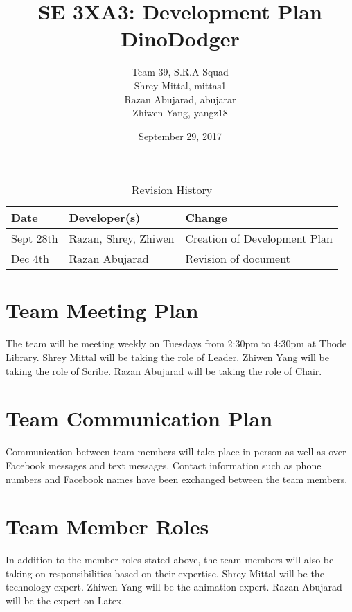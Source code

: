\documentclass{article}
\title{SE 3XA3: Development Plan\\ DinoDodger}
\author{Team 39, S.R.A Squad
		\\ Shrey Mittal, mittas1
		\\ Razan Abujarad, abujarar
		\\ Zhiwen Yang, yangz18
}
\date{September 29, 2017}
\begin{document}
\begin{table}[hp]
\caption{Revision History} \label{TblRevisionHistory}
\begin{tabularx}{\textwidth}{llX}
\toprule
\textbf{Date} & \textbf{Developer(s)} & \textbf{Change}\\
\midrule
 Sept 28th & Razan, Shrey, Zhiwen & Creation of Development Plan\\
 Dec 4th & Razan Abujarad & Revision of document\\
\bottomrule
\end{tabularx}
\end{table}

\newpage

\maketitle

\section{Team Meeting Plan}
The team will be meeting weekly on Tuesdays from 2:30pm to 4:30pm at Thode Library.
\newline
Shrey Mittal will be taking the role of Leader.
\newline
Zhiwen Yang will be taking the role of Scribe.
\newline
Razan Abujarad will be taking the role of Chair.
\newline

\section{Team Communication Plan}
Communication between team members will take place in person as well as over Facebook messages and text messages.
Contact information such as phone numbers and Facebook names have been exchanged between the team members.

\section{Team Member Roles}
In addition to the member roles stated above, the team members will also be taking on responsibilities based on their expertise. 
\newline
Shrey Mittal will be the technology expert.
\newline
Zhiwen Yang will be the animation expert.
\newline
Razan Abujarad will be the expert on Latex.
\end{document}
